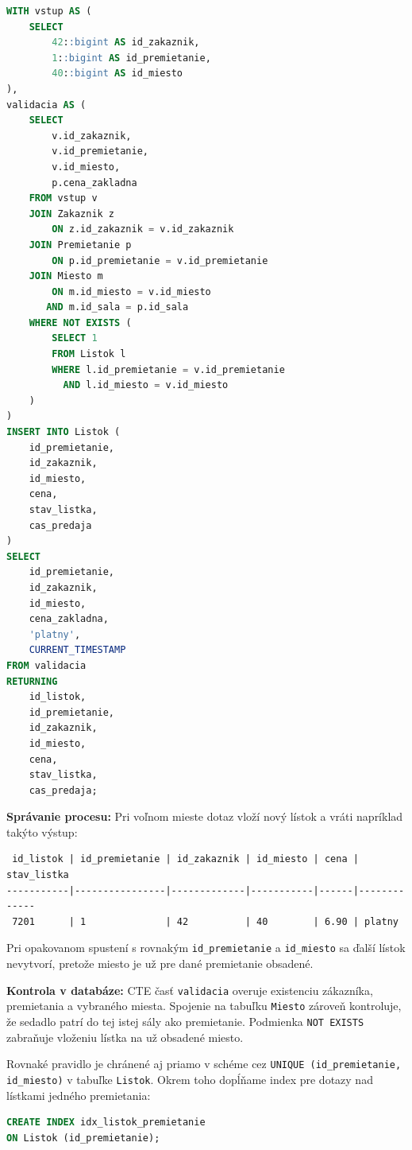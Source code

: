 \documentclass[11pt, a4paper]{article}
\begin{document}
\begin{lstlisting}[language=SQL, caption={Zakúpenie lístka s kontrolou dostupnosti miesta}]
WITH vstup AS (
    SELECT
        42::bigint AS id_zakaznik,
        1::bigint AS id_premietanie,
        40::bigint AS id_miesto
),
validacia AS (
    SELECT
        v.id_zakaznik,
        v.id_premietanie,
        v.id_miesto,
        p.cena_zakladna
    FROM vstup v
    JOIN Zakaznik z
        ON z.id_zakaznik = v.id_zakaznik
    JOIN Premietanie p
        ON p.id_premietanie = v.id_premietanie
    JOIN Miesto m
        ON m.id_miesto = v.id_miesto
       AND m.id_sala = p.id_sala
    WHERE NOT EXISTS (
        SELECT 1
        FROM Listok l
        WHERE l.id_premietanie = v.id_premietanie
          AND l.id_miesto = v.id_miesto
    )
)
INSERT INTO Listok (
    id_premietanie,
    id_zakaznik,
    id_miesto,
    cena,
    stav_listka,
    cas_predaja
)
SELECT
    id_premietanie,
    id_zakaznik,
    id_miesto,
    cena_zakladna,
    'platny',
    CURRENT_TIMESTAMP
FROM validacia
RETURNING
    id_listok,
    id_premietanie,
    id_zakaznik,
    id_miesto,
    cena,
    stav_listka,
    cas_predaja;
\end{lstlisting}

\textbf{Správanie procesu:}
Pri voľnom mieste dotaz vloží nový lístok a vráti napríklad takýto výstup:

\begin{lstlisting}
 id_listok | id_premietanie | id_zakaznik | id_miesto | cena | stav_listka
-----------|----------------|-------------|-----------|------|-------------
 7201      | 1              | 42          | 40        | 6.90 | platny
\end{lstlisting}

Pri opakovanom spustení s rovnakým \texttt{id\_premietanie} a \texttt{id\_miesto} sa ďalší lístok nevytvorí, pretože miesto je už pre dané premietanie obsadené.

\textbf{Kontrola v databáze:}
CTE časť \texttt{validacia} overuje existenciu zákazníka, premietania a vybraného miesta. Spojenie na tabuľku \texttt{Miesto} zároveň kontroluje, že sedadlo patrí do tej istej sály ako premietanie. Podmienka \texttt{NOT EXISTS} zabraňuje vloženiu lístka na už obsadené miesto.

Rovnaké pravidlo je chránené aj priamo v schéme cez \texttt{UNIQUE (id\_premietanie, id\_miesto)} v tabuľke \texttt{Listok}. Okrem toho dopĺňame index pre dotazy nad lístkami jedného premietania:

\begin{lstlisting}[language=SQL]
CREATE INDEX idx_listok_premietanie
ON Listok (id_premietanie);
\end{lstlisting}
\end{document}
